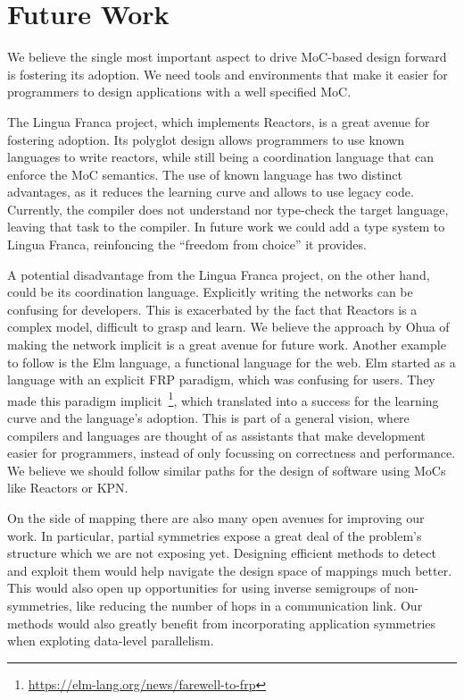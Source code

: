 \section{Future Work}

We believe the single most important aspect to drive \ac{MoC}-based design forward is fostering its adoption.
We need tools and environments that make it easier for programmers to design applications with a well specified \ac{MoC}.

The Lingua Franca project, which implements Reactors, is a great avenue for fostering adoption.
Its polyglot design allows programmers to use known languages to write reactors, while still being a coordination language that can enforce the \ac{MoC} semantics.
The use of known language has two distinct advantages, as it reduces the learning curve and allows to use legacy code. 
Currently, the compiler does not understand nor type-check the target language, leaving that task to the compiler.
In future work we could add a type system to Lingua Franca, reinfoncing the ``freedom from choice'' it provides.

A potential disadvantage from the Lingua Franca project, on the other hand, could be its coordination language. 
Explicitly writing the networks can be confusing for developers.
This is exacerbated by the fact that Reactors is a complex model, difficult to grasp and learn.
We believe the approach by Ohua of making the network implicit is a great avenue for future work.
Another example to follow is the Elm language, a functional language for the web.
Elm started as a language with an explicit \ac{FRP} paradigm, which was confusing for users.
They made this paradigm implicit~\footnote{\url{https://elm-lang.org/news/farewell-to-frp}}, which translated into a success for the learning curve and the language's adoption.
This is part of a general vision, where compilers and languages are thought of as assistants that make development easier for programmers, instead of only focussing on correctness and performance.
We believe we should follow similar paths for the design of software using \acp{MoC} like Reactors or \ac{KPN}.

On the side of mapping there are also many open avenues for improving our work.
In particular, partial symmetries expose a great deal of the problem's structure which we are not exposing yet.
Designing efficient methods to detect and exploit them would help navigate the design space of mappings much better.
This would also open up opportunities for using inverse semigroups of non-symmetries, like reducing the number of hops in a communication link.
Our methods would also greatly benefit from incorporating application symmetries when exploting data-level parallelism.  

